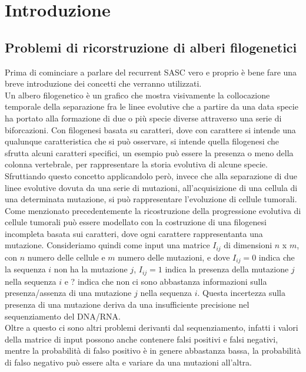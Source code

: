\documentclass{report}
\begin{document}
{\pagestyle{plain}
  \tableofcontents
  \cleardoublepage}

\chapter{Introduzione}

\section{Problemi di ricorstruzione di alberi filogenetici}
  Prima di cominciare a parlare del recurrent SASC vero e proprio è bene fare una breve introduzione dei concetti che verranno utilizzati.\\
  Un albero filogenetico è un grafico che mostra visivamente la collocazione temporale della separazione fra le linee evolutive che a partire da una data specie ha portato alla formazione di due o più specie diverse attraverso una serie di biforcazioni. Con filogenesi basata su caratteri, dove con carattere si intende una qualunque caratteristica che si può osservare, si intende quella filogenesi che sfrutta alcuni caratteri specifici, un esempio può essere la presenza o meno della colonna vertebrale, per rappresentare la storia evolutiva di alcune specie.
  Sfruttiando questo concetto applicandolo però, invece che alla separazione di due linee evolutive dovuta da una serie di mutazioni, all'acquisizione di una cellula di una determinata mutazione, si può rappresentare l'evoluzione di cellule tumorali.\\
  Come menzionato precedentemente la ricostruzione della progressione evolutiva di cellule tumorali può essere modellato con la costruzione di una filogenesi incompleta basata sui caratteri, dove ogni carattere rappresentanta una mutazione.
  Consideriamo quindi come input una matrice  ${I}_{ij}$ di dimensioni $n$ x $m$, con $n$ numero delle cellule e $m$ numero delle mutazioni, e dove ${I}_{ij} = 0$ indica che la sequenza $i$ non ha la mutazione $j$, ${I}_{ij} = 1$ indica la presenza della mutazione $j$ nella sequenza $i$ e ? indica che non ci sono abbastanza informazioni sulla presenza/assenza di una mutazione $j$ nella sequenza $i$. Questa incertezza sulla presenza di una mutazione deriva da una insufficiente precisione nel sequenziamento del DNA/RNA.\\
  Oltre a questo ci sono altri problemi derivanti dal sequenziamento, infatti i valori della matrice di input possono anche contenere falsi positivi e falsi negativi, mentre la probabilità di falso positivo è in genere abbastanza bassa, la probabilità di falso negativo può essere alta e variare da una mutazioni all'altra.
\end{document}
